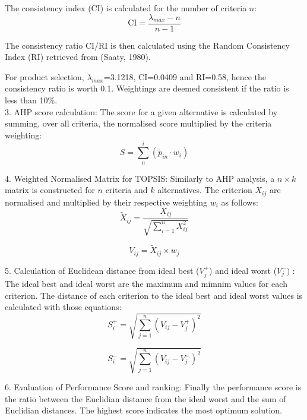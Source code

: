 The consistency index (CI) is calculated for the number of criteria $n$:
\begin{equation}
   \mathrm{CI} = \frac{\lambda_{max}-n}{n-1}
\end{equation}

The consistency ratio CI/RI is then calculated using the Random Consistency Index (RI) retrieved from (Saaty, 1980). 

For product selection, $\lambda_{max}$=3.1218, CI=0.0409 and RI=0.58, hence the consistency ratio is worth 0.1. Weightings are deemed consistent if the ratio is less than 10\%.\\

3. AHP score calculation: The score for a given alternative is calculated by summing, over all criteria, the normalised score multiplied by the criteria weighting:
\begin{equation}
    S=\sum^{i}_{n}(\tilde{p}_{in} \cdot w_{i})
\end{equation}

4. Weighted Normalised Matrix for TOPSIS:
Similarly to AHP analysis, a $n\times k$ matrix is constructed for $n$ criteria and $k$ alternatives. The criterion $X_{ij}$ are normalised and multiplied by their respective weighting $w_i$ as follows:
\begin{equation}
    \tilde{X}_{ij}=\frac{X_{ij}}{\sqrt{\sum^{n}_{i=1}X_{ij}^{2}}}
\end{equation}

\begin{equation}
    V_{ij}=\tilde{X}_{ij}\times w_j
\end{equation}

5. Calculation of Euclidean distance from ideal best ($V_{j}^{+}$) and ideal worst ($V_{j}^{-})$ :
The ideal best and ideal worst are the maximum and mimnim values for each criterion. The distance of each criterion to the ideal best and ideal worst values is calculated with those equations:
\begin{equation}
    S_{i}^{+}=\sqrt{\sum_{j=1}^{n}(V_{ij}-V_{j}^{+})^2}
\end{equation}

\begin{equation}
    S_{i}^{-}=\sqrt{\sum_{j=1}^{n}(V_{ij}-V_{j}^{-})^2}
\end{equation}

6. Evaluation of Performance Score and ranking:
Finally the performance score is the ratio between the Euclidian distance from the ideal worst and the sum of Euclidian distances. The highest score indicates the most optimum solution.


